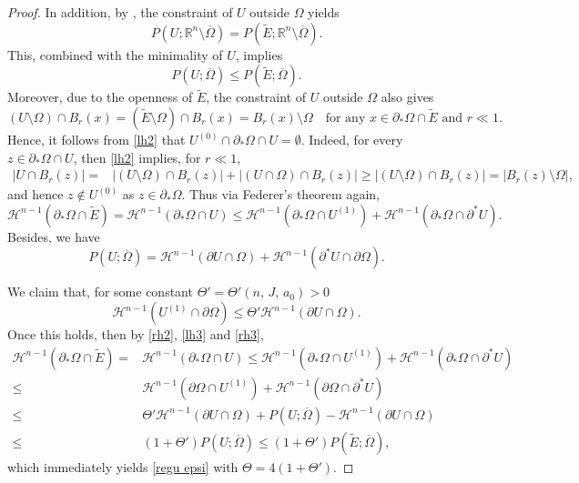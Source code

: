 \documentclass[reqno,11pt]{amsart}
\numberwithin{equation}{section}
\theoremstyle{remark}
\begin{document}
\begin{proof}
In addition, by \cite[Exercise 12.16]{M2012}, the constraint of $U$ outside $\Omega$ yields $$P(U; \mathbb R^n\setminus \overline{\Omega})=P(\widetilde E; \mathbb R^n\setminus \overline{\Omega}).$$
This, combined with the minimality of $U$, 
implies
\begin{equation}\label{rh2}
    P(U;\overline{\Omega})\le P(\widetilde E;\overline{\Omega}). 
\end{equation} 
Moreover, due to the openness of $\widetilde E$, the constraint of $U$ outside $\Omega$ also gives 
\begin{equation}\label{lh2}
     (U\setminus\Omega)\cap B_r(x) =(\widetilde E\setminus\Omega)\cap B_r(x)=B_r(x)\setminus\Omega\quad \text{for any }x\in \partial_*\Omega\cap \widetilde E\text{ and }r\ll 1.
\end{equation}
Hence, it follows from \eqref{lh2} that $U^{(0)}\cap \partial_*\Omega\cap U =\emptyset$. Indeed, for every $z\in  \partial_*\Omega\cap U$, then \eqref{lh2} implies, for $r\ll1$,
\begin{align*}
    |U\cap B_r(z)|=& |(U\setminus\Omega)\cap B_r(z)|+|(U\cap\Omega)\cap B_r(z)|\ge |(U\setminus\Omega)\cap B_r(z)|=|B_r(z)\setminus \Omega|, 
\end{align*} 
and hence $z\notin U^{(0)}$ as  $z\in\partial_*\Omega.$
Thus via Federer's theorem again, 
\begin{equation}\label{lh3}
    \mathcal{H}^{n-1}(\partial_*\Omega\cap \widetilde E)=\mathcal{H}^{n-1}(\partial_*\Omega\cap U)\le \mathcal{H}^{n-1}(\partial_*\Omega\cap U^{(1)})+\mathcal{H}^{n-1}(\partial_*\Omega\cap \partial^* U).
\end{equation}
Besides, we have
\begin{equation}\label{rh3}
    P(U;\overline{\Omega})=\mathcal{H}^{n-1}(\partial U\cap \Omega)+\mathcal{H}^{n-1}(\partial^*U\cap \partial\Omega).
\end{equation}

We claim that, for some  constant $\Theta'=\Theta'(n,\,J,\,a_0)>0$
\begin{equation}\label{E to U}
    \mathcal H^{n-1}( U^{(1)}\cap  \partial \Omega)\le \Theta' \mathcal H^{n-1}(\partial U\cap  \Omega).
\end{equation} 
Once this holds, then by  \eqref{rh2}, \eqref{lh3} and \eqref{rh3}, 
\begin{align*}
    \mathcal{H}^{n-1}(\partial_*\Omega\cap \widetilde E)=& \mathcal{H}^{n-1}(\partial_*\Omega\cap U)\le  \mathcal{H}^{n-1}(\partial_*\Omega\cap U^{(1)})+\mathcal{H}^{n-1}(\partial_*\Omega\cap \partial^* U)\\
    \le & \mathcal{H}^{n-1}(\partial\Omega\cap U^{(1)})+\mathcal{H}^{n-1}(\partial\Omega\cap \partial^* U)\\
 \le & \Theta'\mathcal H^{n-1}(\partial U\cap  \Omega) +   P(U;\overline{\Omega})-\mathcal{H}^{n-1}(\partial U\cap \Omega)\\
 \le & (1+\Theta') P(U;\overline{\Omega})\le (1+\Theta')P(\widetilde E;\overline{\Omega}),
\end{align*}
which immediately yields \eqref{regu epsi} with $\Theta=4(1+\Theta')$.


\end{proof}
\end{document}
